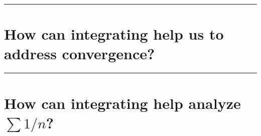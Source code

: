 \documentclass{ximera}
\begin{document}
\hrule

\section{How can integrating help us to address convergence?}


\hrule

\section{How can integrating help analyze $\sum 1/n$?}

\end{document}
